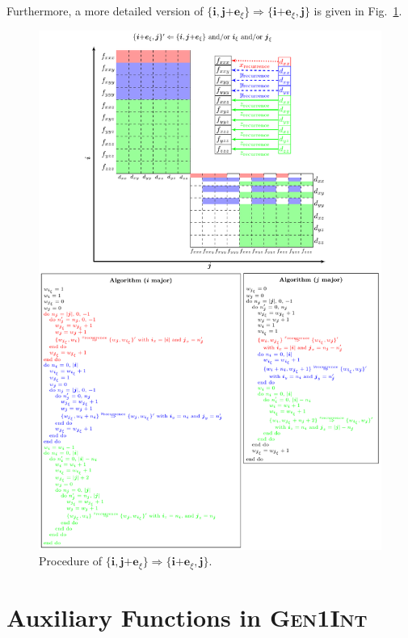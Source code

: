 \documentclass[a4paper,11pt,twoside,openright]{book}
\begin{document}
Furthermore, a more detailed version of $\{\boldsymbol{i},\boldsymbol{j}\mathrm{+}\boldsymbol{e}_{\xi}\}%
\Rightarrow\{\boldsymbol{i}\mathrm{+}\boldsymbol{e}_{\xi},\boldsymbol{j}\}$ is given in Fig.~\ref{fig:recurr-dim2-type1}.
\begin{figure}[hbtp]
  \centering
  \includegraphics[width=5.2in]{recurr_dim2_type1.pdf}
  \caption{Procedure of $\{\boldsymbol{i},\boldsymbol{j}\mathrm{+}\boldsymbol{e}_{\xi}\}%
\Rightarrow\{\boldsymbol{i}\mathrm{+}\boldsymbol{e}_{\xi},\boldsymbol{j}\}$.}
  \label{fig:recurr-dim2-type1}
\end{figure}

\section{Auxiliary Functions in \textsc{Gen1Int}}
\label{sect:auxfun}
\end{document}
